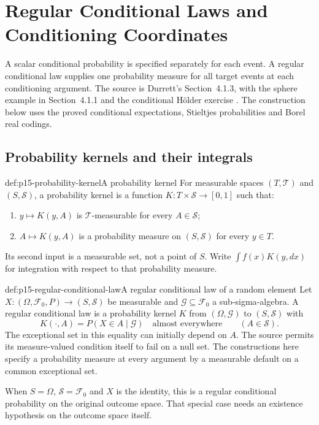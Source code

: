 \chapter{Regular Conditional Laws and Conditioning Coordinates}
\label{sec:p15-regular-conditional-laws}

A scalar conditional probability is specified separately for each event.
A regular conditional law supplies one probability measure for all target
events at each conditioning argument. The source is Durrett's
Section~4.1.3, with the sphere example in Section~4.1.1 and the conditional
H\"older exercise \cite[pp.~210, 214--216]{DurrettPTEAuthor2019}.
The construction below uses the proved conditional expectations, Stieltjes
probabilities and Borel real codings.

\section{Probability kernels and their integrals}
\label{sec:p15-conditional-kernels}

\begin{hbdefinition}{def:p15-probability-kernel}{A probability kernel}
For measurable spaces \((T,\mathcal T)\) and \((S,\mathcal S)\), a
probability kernel is a function
\(K:T\times\mathcal S\to[0,1]\) such that:
\begin{enumerate}
\item \(y\mapsto K(y,A)\) is \(\mathcal T\)-measurable for every
      \(A\in\mathcal S\);
\item \(A\mapsto K(y,A)\) is a probability measure on \((S,\mathcal S)\)
      for every \(y\in T\).
\end{enumerate}
Its second input is a measurable set, not a point of \(S\).
Write \(\int f(x)K(y,dx)\) for integration with respect to that
probability measure.
\end{hbdefinition}

\begin{hbdefinition}{def:p15-regular-conditional-law}{A regular conditional law of a random element}
Let \(X:(\Omega,\mathcal F_0,P)\to(S,\mathcal S)\) be measurable and
\(\mathcal G\subseteq\mathcal F_0\) a sub-sigma-algebra.
A regular conditional law is a probability kernel \(K\) from
\((\Omega,\mathcal G)\) to \((S,\mathcal S)\) with
\[
                      K(\cdot,A)=P(X\in A\mid\mathcal G)
                                  \quad\text{almost everywhere}
                                      \qquad(A\in\mathcal S).
\]
The exceptional set in this equality can initially depend on \(A\).
The source permits its measure-valued condition itself to fail on a null
set. The constructions here specify a probability measure at every
argument by a measurable default on a common exceptional set.

When \(S=\Omega\), \(\mathcal S=\mathcal F_0\) and \(X\) is the identity,
this is a regular conditional probability on the original outcome space.
That special case needs an existence hypothesis on the outcome space itself.
\end{hbdefinition}

